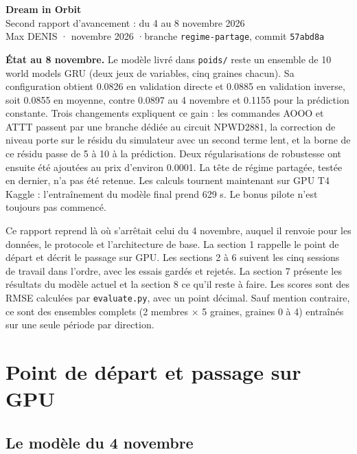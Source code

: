 \documentclass[11pt,a4paper]{article}
\newcommand{\code}[1]{\texttt{#1}}
\begin{document}
\thispagestyle{plain}
\begin{center}
  {\LARGE\bfseries Dream in Orbit}\\[4pt]
  {\large Second rapport d'avancement : du 4 au 8 novembre 2026}\\[8pt]
  {\color{encre2}Max DENIS \quad· novembre 2026 \quad·\quad branche \code{regime-partage}, commit \code{57abd8a}}
\end{center}

\vspace{4pt}
\noindent\colorbox{fond}{\parbox{\dimexpr\linewidth-2\fboxsep}{\small
\textbf{État au 8 novembre.} Le modèle livré dans \code{poids/} reste un ensemble de 10 world models GRU (deux jeux de variables, cinq graines chacun). Sa configuration obtient 0.0826 en validation directe et 0.0885 en validation inverse, soit 0.0855 en moyenne, contre 0.0897 au 4 novembre et 0.1155 pour la prédiction constante. Trois changements expliquent ce gain : les commandes AOOO et ATTT passent par une branche dédiée au circuit NPWD2881, la correction de niveau porte sur le résidu du simulateur avec un second terme lent, et la borne de ce résidu passe de 5 à 10 à la prédiction. Deux régularisations de robustesse ont ensuite été ajoutées au prix d'environ 0.0001. La tête de régime partagée, testée en dernier, n'a pas été retenue. Les calculs tournent maintenant sur GPU T4 Kaggle : l'entraînement du modèle final prend 629 s. Le bonus pilote n'est toujours pas commencé.}}

\vspace{6pt}
Ce rapport reprend là où s'arrêtait celui du 4 novembre, auquel il renvoie pour les données, le protocole et l'architecture de base. La section 1 rappelle le point de départ et décrit le passage sur GPU. Les sections 2 à 6 suivent les cinq sessions de travail dans l'ordre, avec les essais gardés et rejetés. La section 7 présente les résultats du modèle actuel et la section 8 ce qu'il reste à faire. Les scores sont des RMSE calculées par \code{evaluate.py}, avec un point décimal. Sauf mention contraire, ce sont des ensembles complets (2 membres × 5 graines, graines 0 à 4) entraînés sur une seule période par direction.

\section{Point de départ et passage sur GPU}

\subsection{Le modèle du 4 novembre}
\end{document}
